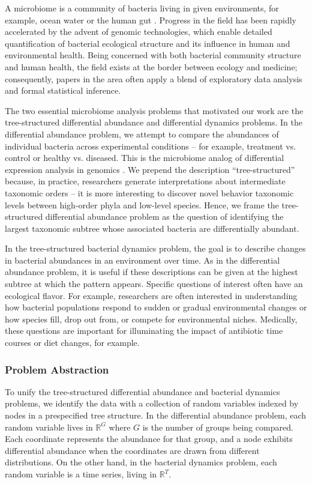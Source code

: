 \documentclass[12pt]{article}
\begin{document}
A microbiome is a community of bacteria living in given environments,
for example, ocean water or the human gut 
\citep{human2012structure, cho2012human}. Progress in the field has
been rapidly accelerated by the advent of genomic technologies, which
enable detailed quantification of bacterial ecological structure and its
influence in human and environmental health. Being concerned with both
bacterial community structure and human health, the field exists at the
border between ecology and medicine; consequently, papers in the area
often apply a blend of exploratory data analysis and formal statistical
inference.

The two essential microbiome analysis problems that motivated our work
are the tree-structured differential abundance and differential dynamics
problems. In the differential abundance problem, we attempt to compare
the abundances of individual bacteria across experimental conditions --
for example, treatment vs. control or healthy vs. diseased. This is the
microbiome analog of differential expression analysis in genomics
\citep{anders2010differential}.
We prepend the description ``tree-structured'' because, in practice,
researchers generate interpretations about intermediate taxonomic orders
-- it is more interesting to discover novel behavior taxonomic levels
between high-order phyla and low-level species. Hence, we frame the
tree-structured differential abundance problem as the question of
identifying the largest taxonomic subtree whose associated bacteria are
differentially abundant.

In the tree-structured bacterial dynamics problem, the goal is to
describe changes in bacterial abundances in an environment over time. As
in the differential abundance problem, it is useful if these
descriptions can be given at the highest subtree at which the pattern
appears. Specific questions of interest often have an ecological flavor.
For example, researchers are often interested in understanding how
bacterial populations respond to sudden or gradual environmental changes
or how species fill, drop out from, or compete for environmental niches.
Medically, these questions are important for illuminating the impact of
antibiotic time courses or diet changes, for example.

\subsubsection*{Problem Abstraction}\label{problem-abstraction}

To unify the tree-structured differential abundance and bacterial
dynamics problems, we identify the data with a collection of random
variables indexed by nodes in a prespecified tree structure. In the
differential abundance problem, each random variable lives in
\(\mathbb{R}^{G}\) where \(G\) is the number of groups being compared.
Each coordinate represents the abundance for that group, and a node
exhibits differential abundance when the coordinates are drawn from
different distributions. On the other hand, in the bacterial dynamics
problem, each random variable is a time series, living in
\(\mathbb{R}^{T}\).
\end{document}
